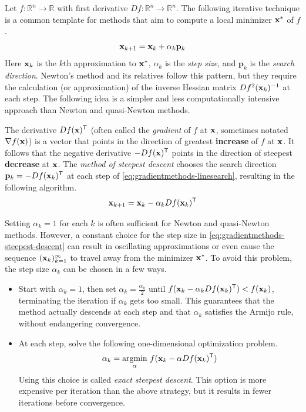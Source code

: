 Let $f:\mathbb{R}^n \rightarrow \mathbb{R}$ with first derivative $Df:\mathbb{R}^n \rightarrow \mathbb{R}^n$.
The following iterative technique is a common template for methods that aim to compute a local minimizer $\mathbf{x}^*$ of $f$.
\begin{equation}
\mathbf{x}_{k+1} = \mathbf{x}_k + \alpha_{k}\mathbf{p}_k
\label{eq:gradientmethods-linesearch}
\end{equation}
Here $\mathbf{x}_k$ is the $k$th approximation to $\mathbf{x}^*$, $\alpha_k$ is the \emph{step size}, and $\mathbf{p}_k$ is the \emph{search direction}.
Newton's method and its relatives follow this pattern, but they require the calculation (or approximation) of the inverse Hessian matrix $Df^2(\mathbf{x}_k)^{-1}$ at each step.
The following idea is a simpler and less computationally intensive approach than Newton and quasi-Newton methods.

The derivative $Df(\mathbf{x})^{\mathsf T}$ (often called the \emph{gradient} of $f$ at $\mathbf{x}$, sometimes notated $\nabla f(\mathbf{x})$) is a vector that points in the direction of greatest \textbf{increase} of $f$ at $\mathbf{x}$.
It follows that the negative derivative $-Df(\mathbf{x})^{\mathsf T}$ points in the direction of steepest \textbf{decrease} at $\mathbf{x}$.
The \emph{method of steepest descent} chooses the search direction $\mathbf{p}_k = -Df(\mathbf{x}_k)^{\mathsf T}$ at each step of \eqref{eq:gradientmethods-linesearch}, resulting in the following algorithm.
\begin{equation}
\mathbf{x}_{k+1} = \mathbf{x}_k - \alpha_{k}Df(\mathbf{x}_k)^{\mathsf T}
\label{eq:gradientmethods-steepest-descent}
\end{equation}

Setting $\alpha_k = 1$ for each $k$ is often sufficient for Newton and quasi-Newton methods.
However, a constant choice for the step size in \eqref{eq:gradientmethods-steepest-descent} can result in oscillating approximations or even cause the sequence $(\mathbf{x}_k)_{k=1}^\infty$ to travel away from the minimizer $\mathbf{x}^*$.
To avoid this problem, the step size $\alpha_k$ can be chosen in a few ways.
\begin{itemize}
    \item Start with $\alpha_k = 1$, then set $\alpha_k = \frac{\alpha_k}{2}$ until $f(\mathbf{x}_k - \alpha_k Df(\mathbf{x}_k)^{\mathsf T}) < f(\mathbf{x}_k)$, terminating the iteration if $\alpha_k$ gets too small.
    This guarantees that the method actually descends at each step and that $\alpha_k$ satisfies the Armijo rule, without endangering convergence.

    \item At each step, solve the following one-dimensional optimization problem.
    \[
    \alpha_k = \underset{\alpha}{\mbox{argmin}}\ f(\mathbf{x}_k - \alpha Df(\mathbf{x}_k)^{\mathsf T})
    \]
    Using this choice is called \emph{exact steepest descent}.
    This option is more expensive per iteration than the above strategy, but it results in fewer iterations before convergence.
\end{itemize}

